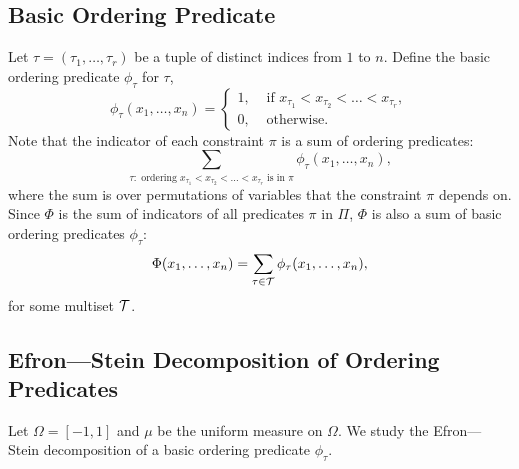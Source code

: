 \documentclass[11pt]{article}
\newif\ifconf
\newcommand {\Tau}    {{\cal{T}}}
\begin{document}
\subsection{Basic Ordering Predicate}\label{subsec:bop}
Let $\tau = (\tau_1,\dots,\tau_r)$ be a tuple of distinct
indices from $1$ to $n$.
Define the basic ordering predicate $\phi_{\tau}$ for $\tau$,
$$\phi_\tau(x_1,\dots, x_n) =
\begin{cases}
1, & \text{ if } x_{\tau_1} < x_{\tau_2} < \dots < x_{\tau_r},\\
0, & \text{ otherwise.}
\end{cases}
$$
Note that the indicator of each constraint
$\pi$ is a sum of ordering predicates:
$$\sum_{\tau: \text{ ordering } x_{\tau_1} < x_{\tau_2} < \dots < x_{\tau_r} \text{ is in } \pi} \phi_\tau(x_1,\dots, x_n),$$
where the sum is over permutations of variables that
the constraint $\pi$ depends on.
Since $\Phi$ is the sum of indicators of all
predicates $\pi$ in $\Pi$, $\Phi$ is also a sum
of basic ordering predicates $\phi_{\tau}$:
$$\Phi(x_1,\dots,x_n) = \sum_{\tau \in \Tau}
\phi_\tau(x_1,\dots, x_n) \ifconf.\else,\fi$$
 for some multiset $\Tau$.

\subsection{Efron---Stein Decomposition of Ordering Predicates}
Let $\Omega = [-1,1]$ and $\mu$ be the uniform measure on $\Omega$. We study the Efron---Stein decomposition
of a basic ordering predicate $\phi_{\tau}$.
\end{document}
